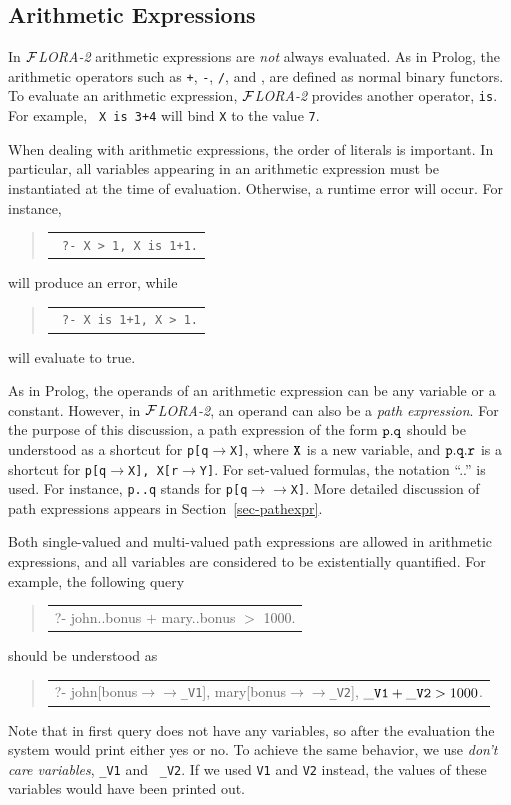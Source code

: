 \documentclass[11pt]{article}
\newenvironment{qrules}{\begin{quote}\tt\begin{tabular}[t]{l}}%
{\end{tabular}\end{quote}}
\newcommand{\fd}{\ensuremath{{\rightarrow}}}                   %
\newcommand{\mvd}{\ensuremath{{\rightarrow\!\!\!\!\rightarrow}}}  %
\newcommand{\FLORA}{{\mbox{${\cal F}${\small\it LORA}\rm\emph{-2}}}\xspace}
\begin{document}
\subsection{Arithmetic Expressions}


In \FLORA arithmetic expressions are \emph{not} always evaluated. As in
Prolog, the arithmetic operators such as {\tt +}, {\tt -}, {\tt /}, and
{\tt *}, are defined as normal binary functors. To evaluate an arithmetic
expression, \FLORA provides another operator, {\tt is}.  For example, {\tt
  X is 3+4} will bind {\tt X} to the value {\tt 7}.

When dealing with arithmetic expressions, the order of literals is
important.  In particular, all variables appearing in an arithmetic
expression must be instantiated at the time of evaluation. Otherwise, a
runtime error will occur. For instance, 
\begin{qrules}
  \tt
?- X > 1, X is 1+1.
\end{qrules}
will produce an error, while
\begin{qrules}
  \tt
?- X is 1+1, X > 1.
\end{qrules}
will evaluate to true.

As in Prolog, the operands of an arithmetic expression can be any variable
or a constant. However, in \FLORA, an operand can also be a \emph{path
  expression}. For the purpose of this discussion, a path expression of the
form $\tt p.q$ should be understood as a shortcut for {\tt p[q$\fd$X]}, where
$\tt X$ is a new variable, and $\tt p.q.r$ is a shortcut for {\tt p[q$\fd$X],
  X[r$\fd$Y]}. For set-valued formulas, the notation ``..'' is used. For
instance, {\tt p..q} stands for {\tt p[q$\mvd$X]}. More detailed discussion
of path expressions appears in Section~\ref{sec-pathexpr}.

Both single-valued and multi-valued path expressions are allowed in
arithmetic expressions, and all variables are considered to be
existentially quantified. For example, the following query
\begin{qrules}
?- john..bonus $+$ mary..bonus $>$ 1000.
\end{qrules}
should be understood as
\begin{qrules}
?- john[bonus{\mvd}{\tt \_V1}], mary[bonus{\mvd}{\tt \_V2}], ${\tt \_V1}+{\tt \_V2} > 1000$.
\end{qrules}
Note that in first query does not have any variables, so after the
evaluation the system would print either yes or no. To achieve the same
behavior, we use \emph{don't care variables}, {\tt \_V1} and {\tt
  \_V2}. If we used {\tt V1} and {\tt V2} instead, the values of these
variables would have been printed out.
\end{document}

